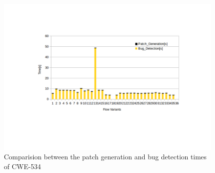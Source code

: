 \begin{figure}[!htb]
\centering
\includegraphics[trim=5.0cm 0.0cm 0.0cm 0.0cm, scale=0.7]{pdf/time2.pdf}
\vspace{-4.5cm}
\caption{Comparision between the patch generation and bug detection times of CWE-534}
\label{fig:time2}
\end{figure}
